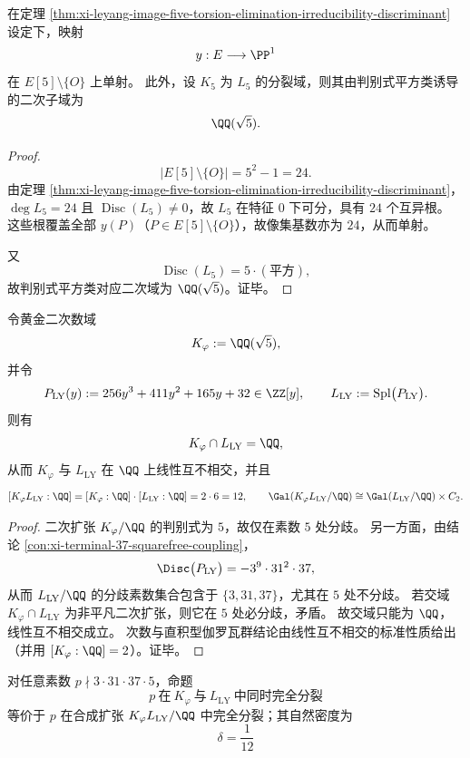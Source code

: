 \begin{proposition}[五扭点像的分离性与二次分解域]\label{prop:xi-leyang-image-five-torsion-separation-quadratic-field}
在定理 \ref{thm:xi-leyang-image-five-torsion-elimination-irreducibility-discriminant} 设定下，映射
\[
y:E\longrightarrow \PP^1
\]
在 \(E[5]\setminus\{O\}\) 上单射。
此外，设 \(K_5\) 为 \(L_5\) 的分裂域，则其由判别式平方类诱导的二次子域为
\[
\QQ(\sqrt{5}).
\]
\end{proposition}
\begin{proof}
\[
|E[5]\setminus\{O\}|=5^2-1=24.
\]
由定理 \ref{thm:xi-leyang-image-five-torsion-elimination-irreducibility-discriminant}，\(\deg L_5=24\) 且 \(\operatorname{Disc}(L_5)\neq 0\)，故 \(L_5\) 在特征 \(0\) 下可分，具有 \(24\) 个互异根。
这些根覆盖全部 \(y(P)\)（\(P\in E[5]\setminus\{O\}\)），故像集基数亦为 \(24\)，从而单射。

又
\[
\operatorname{Disc}(L_5)=5\cdot(\text{平方}),
\]
故判别式平方类对应二次域为 \(\QQ(\sqrt{5})\)。证毕。
\end{proof}

\begin{theorem}\label{thm:xi-sqrt5-axis-leyang-cubic-linear-disjoint}
令黄金二次数域
\[
K_\varphi:=\QQ(\sqrt{5}),
\]
并令
\[
P_{\mathrm{LY}}(y):=256y^{3}+411y^{2}+165y+32\in\ZZ[y],
\qquad
L_{\mathrm{LY}}:=\mathrm{Spl}\bigl(P_{\mathrm{LY}}\bigr).
\]
则有
\[
K_\varphi\cap L_{\mathrm{LY}}=\QQ,
\]
从而 \(K_\varphi\) 与 \(L_{\mathrm{LY}}\) 在 \(\QQ\) 上线性互不相交，并且
\[
[K_\varphi L_{\mathrm{LY}}:\QQ]=[K_\varphi:\QQ]\cdot[L_{\mathrm{LY}}:\QQ]=2\cdot 6=12,
\qquad
\Gal(K_\varphi L_{\mathrm{LY}}/\QQ)\cong \Gal(L_{\mathrm{LY}}/\QQ)\times C_2.
\]
\end{theorem}

\begin{proof}
二次扩张 \(K_\varphi/\QQ\) 的判别式为 \(5\)，故仅在素数 \(5\) 处分歧。
另一方面，由结论 \ref{con:xi-terminal-37-squarefree-coupling}，
\[
\Disc\bigl(P_{\mathrm{LY}}\bigr)=-3^9\cdot 31^2\cdot 37,
\]
从而 \(L_{\mathrm{LY}}/\QQ\) 的分歧素数集合包含于 \(\{3,31,37\}\)，尤其在 \(5\) 处不分歧。
若交域 \(K_\varphi\cap L_{\mathrm{LY}}\) 为非平凡二次扩张，则它在 \(5\) 处必分歧，矛盾。
故交域只能为 \(\QQ\)，线性互不相交成立。
次数与直积型伽罗瓦群结论由线性互不相交的标准性质给出（并用 \([K_\varphi:\QQ]=2\)）。证毕。
\end{proof}

\begin{corollary}\label{cor:xi-sqrt5-leyang-double-split-density-1-12}
对任意素数 \(p\nmid 3\cdot 31\cdot 37\cdot 5\)，命题
\[
p\ \text{在}\ K_\varphi\ \text{与}\ L_{\mathrm{LY}}\ \text{中同时完全分裂}
\]
等价于 \(p\) 在合成扩张 \(K_\varphi L_{\mathrm{LY}}/\QQ\) 中完全分裂；其自然密度为
\[
\boxed{\;\delta=\frac{1}{12}\;}
\]
\end{corollary}

